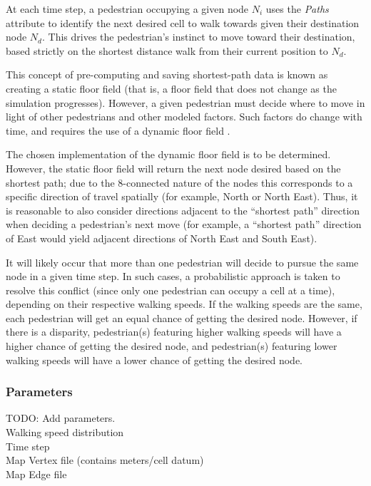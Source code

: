 \documentclass[12pt]{article}
\begin{document}
At each time step, a pedestrian occupying a given node $N_i$ uses the
\textit{Paths} attribute to identify the next desired cell to walk towards given
their destination node $N_d$. This drives the pedestrian’s instinct to move
toward their destination, based strictly on the shortest distance walk from
their current position to $N_d$.

This concept of pre-computing and saving shortest-path data is known as creating
a static floor field (that is, a floor field that does not change as the
simulation progresses). However, a given pedestrian must decide where to move
in light of other pedestrians and other modeled factors. Such factors do change
with time, and requires the use of a dynamic floor field
\cite{burstedde2001simulation}.

The chosen implementation of the dynamic floor field is to be determined.
However, the static floor field will return the next node desired based on the
shortest path; due to the 8-connected nature of the nodes this corresponds
to a specific direction of travel spatially (for example, North or North East).
Thus, it is reasonable to also consider directions adjacent to the “shortest
path” direction when deciding a pedestrian’s next move (for example, a “shortest
path” direction of East would yield adjacent directions of North East and
South East).

It will likely occur that more than one pedestrian will decide to pursue the
same node in a given time step. In such cases, a probabilistic approach is taken
to resolve this conflict (since only one pedestrian can occupy a cell at a
time), depending on their respective walking speeds. If the walking speeds are
the same, each pedestrian will get an equal chance of getting the desired node.
However, if there is a disparity, pedestrian(s) featuring higher walking speeds
will have a higher chance of getting the desired node, and pedestrian(s)
featuring lower walking speeds will have a lower chance of getting the desired
node.

\subsubsection{Parameters}

TODO: Add parameters. \\
Walking speed distribution \\
Time step \\
Map Vertex file (contains meters/cell datum) \\
Map Edge file \\
\end{document}
